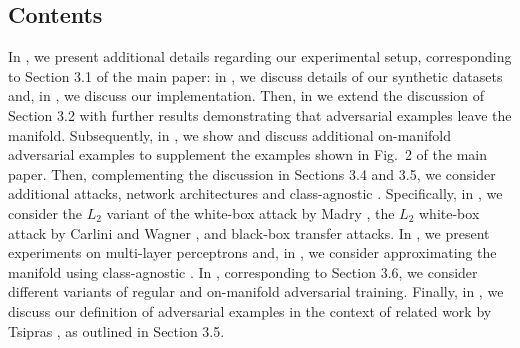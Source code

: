 \begin{appendix}
\subsection{Contents}

In , we present additional details regarding our experimental setup, corresponding to Section 3.1 of the main paper: in , we discuss details of our synthetic \Fonts datasets and, in , we discuss our \VAEGAN implementation. Then, in  we extend the discussion of Section 3.2 with further results demonstrating that adversarial examples leave the manifold. Subsequently, in , we show and discuss additional on-manifold adversarial examples to supplement the examples shown in Fig.\ 2 of the main paper. Then, complementing the discussion in Sections 3.4 and 3.5, we consider additional attacks, network architectures and class-agnostic \VAEGANs. Specifically, in , we consider the $L_2$ variant of the white-box attack by Madry \etal \cite{MadryICLR2018}, the $L_2$ white-box attack by Carlini and Wagner \cite{CarliniSP2017}, and black-box transfer attacks. In , we present experiments on multi-layer perceptrons and, in , we consider approximating the manifold using class-agnostic \VAEGANs. In , corresponding to Section 3.6, we consider different variants of regular and on-manifold adversarial training. Finally, in , we discuss our definition of adversarial examples in the context of related work by Tsipras \etal \cite{TsiprasARXIV2018}, as outlined in Section 3.5.


\end{appendix}
